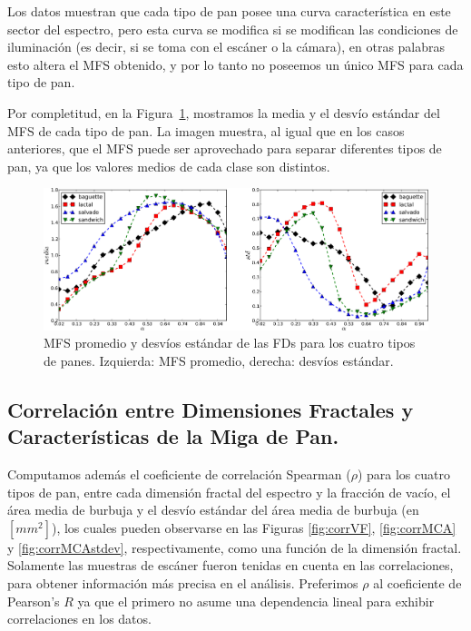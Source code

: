 Los datos muestran que cada tipo de pan posee una curva característica en este sector del espectro, pero esta curva se modifica si se modifican las condiciones de iluminación (es decir, si se toma con el escáner o la cámara), en otras palabras esto altera el MFS obtenido, y por lo tanto no poseemos un único MFS para cada tipo de pan. 

Por completitud, en la Figura~\ref{fig:meansMFS}, mostramos la media y el desvío estándar del MFS de cada tipo de pan.
La imagen muestra, al igual que en los casos anteriores, que el MFS puede ser aprovechado para separar diferentes tipos de pan, ya que los valores medios de cada clase son distintos.


\begin{figure}[h!]
\centering
\includegraphics[width=12cm]{figures/panstd}
\caption[MFS promedio y desvíos estándar de las FDs para los cuatro tipos de panes]{MFS promedio y desvíos estándar de las FDs para los cuatro tipos de panes. Izquierda: MFS promedio, derecha: desvíos estándar.}
\label{fig:meansMFS}
\end{figure}

\subsection{Correlación entre Dimensiones Fractales y Características de la Miga de Pan.}

Computamos además el coeficiente de correlación Spearman ($\rho$) para los cuatro tipos de pan, entre cada dimensión fractal del espectro y la fracción de vacío, el área media de burbuja y el desvío estándar del área media de burbuja (en $[mm^{2}]$), los cuales pueden observarse en las Figuras \ref{fig:corrVF}, \ref{fig:corrMCA} y \ref{fig:corrMCAstdev}, respectivamente, como una función de la dimensión fractal.
Solamente las muestras de escáner fueron tenidas en cuenta en las correlaciones, para obtener información más precisa en el análisis.
Preferimos $\rho$ al coeficiente de Pearson's $R$ ya que el primero no asume una dependencia lineal para exhibir correlaciones en los datos.

